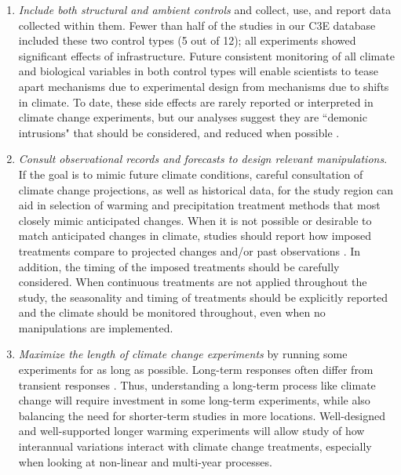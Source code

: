 \documentclass{article}
\begin{document}
\begin{enumerate}
\item\textit{Include both structural and ambient controls} and collect, use, and report data collected within them. Fewer than half of the studies in our C3E database included these two control types (5 out of 12); all experiments showed significant effects of infrastructure. Future consistent monitoring of all climate and biological variables in both control types will enable scientists to tease apart mechanisms due to experimental design from mechanisms due to shifts in climate. To date, these side effects are rarely reported or interpreted in climate change experiments, but our analyses suggest they are ``demonic intrusions" that should be considered, and reduced when possible \citep{hurlbert1984}. 
\item\textit{Consult observational records and forecasts to design relevant manipulations}. If the goal is to mimic future climate conditions, careful consultation of climate change projections, as well as historical data, for the study region can aid in selection of warming and precipitation treatment methods that most closely mimic anticipated changes. When it is not possible or desirable to match anticipated changes in climate, studies should report how imposed treatments compare to projected changes and/or past observations \citep[see, e.g.,][]{hoover2014}. In addition, the timing of the imposed treatments should be carefully considered. When continuous treatments are not applied throughout the study, the seasonality and timing of treatments should be explicitly reported and the climate should be monitored throughout, even when no manipulations are implemented.
\item\textit{Maximize the length of climate change experiments} by running some experiments for as long as possible. Long-term responses often differ from transient responses  \citep{saleska2002,franklin1989,giasson2013,harte2015}. Thus, understanding a long-term process like climate change will require investment in some long-term experiments, while also balancing the need for shorter-term studies in more locations. Well-designed and well-supported longer warming experiments will allow study of how interannual variations interact with climate change treatments, especially when looking at non-linear and multi-year processes. %

\end{enumerate}

\clearpage
\end{document}
